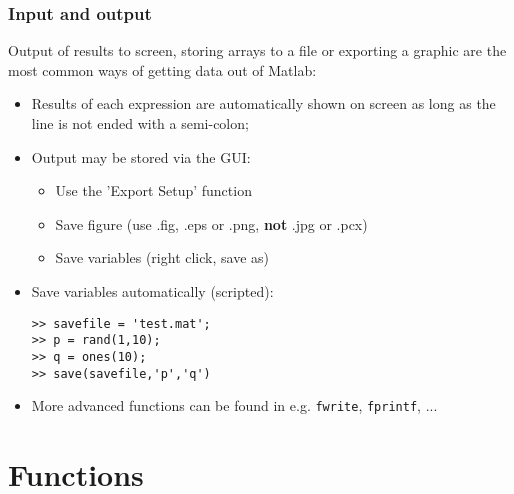 \begin{frame}[fragile]
 \frametitle{Input and output}
 Output of results to screen, storing arrays to a file or exporting a graphic are the most common ways of getting data out of Matlab:
 \begin{itemize}[<+->]
   \item Results of each expression are automatically shown on screen as long as the line is not ended with a semi-colon;
   \item Output may be stored via the GUI:
    \begin{itemize}
      \item Use the 'Export Setup' function
      \item Save figure (use .fig, .eps or .png, \textbf{not} .jpg or .pcx)
      \item Save variables (right click, save as)
    \end{itemize}
   \item Save variables automatically (scripted):
    \begin{lstlisting}
>> savefile = 'test.mat';
>> p = rand(1,10);
>> q = ones(10);
>> save(savefile,'p','q')
   \end{lstlisting}
   \item More advanced functions can be found in e.g.  \lstinline$fwrite$, \lstinline$fprintf$, ...
 \end{itemize}
\end{frame}

\section{Functions}
